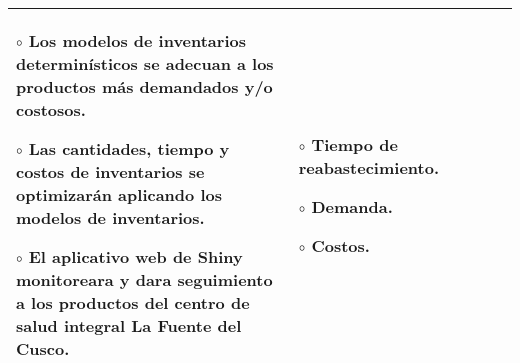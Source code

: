 \begin{landscape}
\begin{table}[h!]
\begin{tabular}{|p{4.5cm}|p{4.5cm}|p{4.5cm}|p{3cm}|p{4.2cm}|}
{    $\circ$ Los modelos de inventarios determinísticos se adecuan a los productos más demandados y/o costosos.\vspace{0.2cm}

    $\circ$ Las cantidades, tiempo y costos de inventarios se optimizarán aplicando los modelos de inventarios.\vspace{0.2cm}

    $\circ$ El aplicativo web de Shiny monitoreara y dara seguimiento a los productos del centro de salud integral La Fuente del Cusco.

    } & \multicolumn{1}{p{3cm}|}{
    \vspace{0.2cm}
    $\circ$ Tiempo de reabastecimiento.\vspace{0.2cm}

    $\circ$ Demanda.\vspace{0.2cm}

    $\circ$ Costos.
    }  & \\ \hline
\end{tabular}
\end{table}
\end{landscape}

